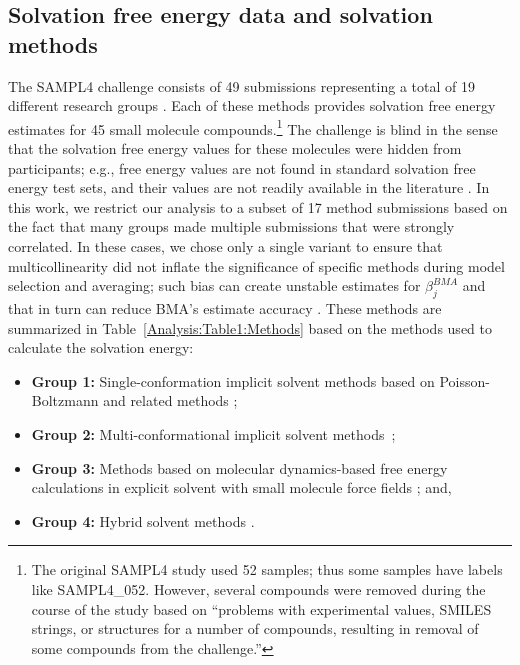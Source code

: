 \documentclass[journal=jpcbfk, manuscript=article]{achemso}
\newcommand{\+}[1]{\ensuremath{\mathbf{#1}}}
\begin{document}
\subsection{Solvation free energy data and solvation methods} \label{EP:DataModels}
The SAMPL4 challenge consists of 49 submissions representing a total of 19 different research groups \cite{Mobley:2014}.
Each of these methods provides solvation free energy estimates for 45 small molecule compounds.\footnote{The original SAMPL4 study used 52 samples; thus some samples have labels like SAMPL4\_052. However, several compounds were removed during the course of the study based on ``problems with experimental values, SMILES strings, or structures for a number of compounds, resulting in removal of some compounds from the challenge.''\cite{Mobley:2014}}
The challenge is blind in the sense that the solvation free energy values for these molecules were hidden from participants; e.g., free energy values are not found in standard solvation free energy test sets, and their values are not readily available in the literature \cite{Guthrie:2014}. 
In this work, we restrict our analysis to a subset of 17 method submissions based on the fact that many groups made multiple submissions that were strongly correlated.
In these cases, we chose only a single variant to ensure that multicollinearity did not inflate the significance of specific methods during model selection and averaging; such bias can create unstable estimates for $\beta^{BMA}_j$ and that in turn can reduce BMA's estimate accuracy \cite{Clyde:1999}.
These methods are summarized in Table~\ref{Analysis:Table1:Methods} based on the methods used to calculate the solvation energy: 
\begin{itemize} 
	\item \textbf{Group 1:} Single-conformation implicit solvent methods \cite{Ellingson:2014, Nicholl:2010, Hawkins} based on Poisson-Boltzmann and related methods \cite{Fixman:1979, Honig:1995, Davis:1990};
	\item \textbf{Group 2:} Multi-conformational implicit solvent methods~\cite{Sandberg:2013, Klamt:2009, Hogues:2014, Sulea:2011, Reinisch:2014}; 
	\item \textbf{Group 3:} Methods based on molecular dynamics-based free energy calculations in explicit solvent \cite{Klimovich:2010,Muddana:2014,Mobley:2009c,Mobley:2007} with small molecule force fields \cite{Wang:2004B};  and, 
	\item \textbf{Group 4:} Hybrid solvent methods \cite{Li:2014}.
\end{itemize}
\end{document}
